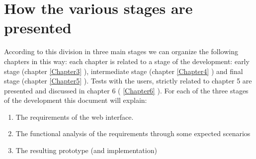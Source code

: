 \section{How the various stages are presented}
According to this division in three main stages we can organize the following chapters in this way:
each chapter is related to a stage of the development: early stage (chapter  \ref{Chapter3} ), intermediate stage (chapter \ref{Chapter4} ) and final stage (chapter \ref{Chapter5} ). Tests with the users, strictly related to chapter 5 are presented and discussed in chapter 6 ( \ref{Chapter6} ).
For each of the three stages of the development this document will explain:

\begin {enumerate}

\item
The requirements of the web interface.

\item
The functional analysis of the requirements through some expected scenarios

\item
The resulting prototype (and implementation)  

\end {enumerate} 



 